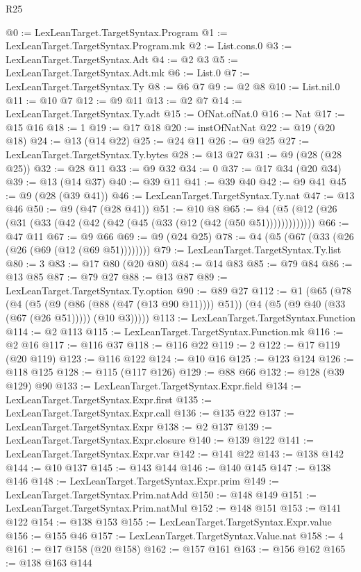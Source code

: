 \begin{lexlean}{R25}
\begin{coremodule}
@0 := LexLeanTarget.TargetSyntax.Program
@1 := LexLeanTarget.TargetSyntax.Program.mk
@2 := List.cons.{0}
@3 := LexLeanTarget.TargetSyntax.Adt
@4 := @2 @3
@5 := LexLeanTarget.TargetSyntax.Adt.mk
@6 := List.{0}
@7 := LexLeanTarget.TargetSyntax.Ty
@8 := @6 @7
@9 := @2 @8
@10 := List.nil.{0}
@11 := @10 @7
@12 := @9 @11
@13 := @2 @7
@14 := LexLeanTarget.TargetSyntax.Ty.adt
@15 := OfNat.ofNat.{0}
@16 := Nat
@17 := @15 @16
@18 := 1
@19 := @17 @18
@20 := instOfNatNat
@22 := @19 (@20 @18)
@24 := @13 (@14 @22)
@25 := @24 @11
@26 := @9 @25
@27 := LexLeanTarget.TargetSyntax.Ty.bytes
@28 := @13 @27
@31 := @9 (@28 (@28 @25))
@32 := @28 @11
@33 := @9 @32
@34 := 0
@37 := @17 @34 (@20 @34)
@39 := @13 (@14 @37)
@40 := @39 @11
@41 := @39 @40
@42 := @9 @41
@45 := @9 (@28 (@39 @41))
@46 := LexLeanTarget.TargetSyntax.Ty.nat
@47 := @13 @46
@50 := @9 (@47 (@28 @41))
@51 := @10 @8
@65 := @4 (@5 (@12 (@26 (@31 (@33 (@42 (@42 (@42 (@45 (@33 (@12 (@42 (@50 @51)))))))))))))
@66 := @47 @11
@67 := @9 @66
@69 := @9 (@24 @25)
@78 := @4 (@5 (@67 (@33 (@26 (@26 (@69 (@12 (@69 @51))))))))
@79 := LexLeanTarget.TargetSyntax.Ty.list
@80 := 3
@83 := @17 @80 (@20 @80)
@84 := @14 @83
@85 := @79 @84
@86 := @13 @85
@87 := @79 @27
@88 := @13 @87
@89 := LexLeanTarget.TargetSyntax.Ty.option
@90 := @89 @27
@112 := @1
    (@65
      (@78
        (@4
          (@5 (@9 (@86 (@88 (@47 (@13 @90 @11)))) @51))
          (@4 (@5 (@9 @40 (@33 (@67 (@26 @51))))) (@10 @3)))))
@113 := LexLeanTarget.TargetSyntax.Function
@114 := @2 @113
@115 := LexLeanTarget.TargetSyntax.Function.mk
@116 := @2 @16
@117 := @116 @37
@118 := @116 @22
@119 := 2
@122 := @17 @119 (@20 @119)
@123 := @116 @122
@124 := @10 @16
@125 := @123 @124
@126 := @118 @125
@128 := @115 (@117 @126)
@129 := @88 @66
@132 := @128 (@39 @129) @90
@133 := LexLeanTarget.TargetSyntax.Expr.field
@134 := LexLeanTarget.TargetSyntax.Expr.first
@135 := LexLeanTarget.TargetSyntax.Expr.call
@136 := @135 @22
@137 := LexLeanTarget.TargetSyntax.Expr
@138 := @2 @137
@139 := LexLeanTarget.TargetSyntax.Expr.closure
@140 := @139 @122
@141 := LexLeanTarget.TargetSyntax.Expr.var
@142 := @141 @22
@143 := @138 @142
@144 := @10 @137
@145 := @143 @144
@146 := @140 @145
@147 := @138 @146
@148 := LexLeanTarget.TargetSyntax.Expr.prim
@149 := LexLeanTarget.TargetSyntax.Prim.natAdd
@150 := @148 @149
@151 := LexLeanTarget.TargetSyntax.Prim.natMul
@152 := @148 @151
@153 := @141 @122
@154 := @138 @153
@155 := LexLeanTarget.TargetSyntax.Expr.value
@156 := @155 @46
@157 := LexLeanTarget.TargetSyntax.Value.nat
@158 := 4
@161 := @17 @158 (@20 @158)
@162 := @157 @161
@163 := @156 @162
@165 := @138 @163 @144

\end{coremodule}
\end{lexlean}
